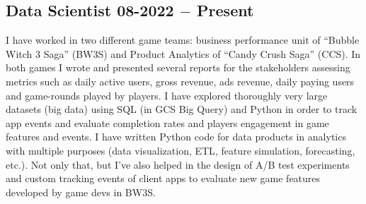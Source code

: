 \subsection{{Data Scientist \hfill 08-2022 $-$ Present}}
\begin{zitemize}
\item 
I have worked in two different game teams: business performance unit of ``Bubble Witch 3 Saga'' (BW3S) and Product Analytics of ``Candy Crush Saga'' (CCS). 
In both games I wrote and presented several reports for the stakeholders assessing metrics such as 
daily active users, gross revenue, ads revenue, daily paying users and game-rounds played by players. 
I have explored thoroughly very large datasets (big data) using SQL (in GCS Big Query) and Python 
in order to track app events and evaluate completion rates and players engagement in game features and events.
I have written Python code for data products in analytics with multiple purposes (data visualization, ETL, feature simulation, forecasting, etc.).
Not only that, but I've also helped in the design of A/B test experiments and custom tracking events of client apps to evaluate new game features developed by game devs in BW3S. 
\end{zitemize}


